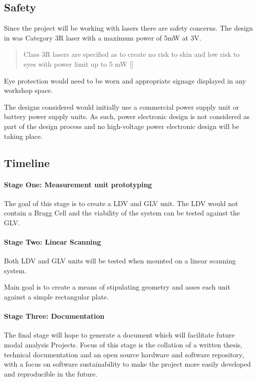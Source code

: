 \hypertarget{safety}{%
\subsection{Safety}\label{safety}}

Since the project will be working with lasers there are safety concerns. The
design in \cite{MALAHS2015DESIGNOA} was Category 3R laser with a maximum power
of 5mW at 3V.

\begin{quote}
Class 3R lasers are specified as to create no risk to skin and low risk to eyes
with power limit up to 5 mW [\cite{SAFETY}]
\end{quote}

Eye protection would need to be worn and appropriate signage displayed in any
workshop space.

The designs considered would initially use a commercial power supply unit or
battery power supply units. As such, power electronic design is not considered
as part of the design process and no high-voltage power electronic design will
be taking place.


\hypertarget{timeline}{%
\subsection{Timeline}\label{timeline}}

\paragraph{Stage One: Measurement unit prototyping}

The goal of this stage is to create a LDV and GLV unit. The LDV would not
contain a Bragg Cell and the viability of the system can be tested against the
GLV.

\paragraph{Stage Two: Linear Scanning}

Both LDV and GLV units will be tested when mounted on a linear scanning system.

Main goal is to create a means of stipulating geometry and asses each unit
against a simple rectangular plate.

\paragraph{Stage Three: Documentation}

The final stage will hope to generate a document which will facilitate future
modal analysis Projects. Focus of this stage is the collation of a written
thesis, technical documentation and an open source hardware and software
repository, with a focus on software sustainability to make the project more
easily developed and reproducible in the future.

